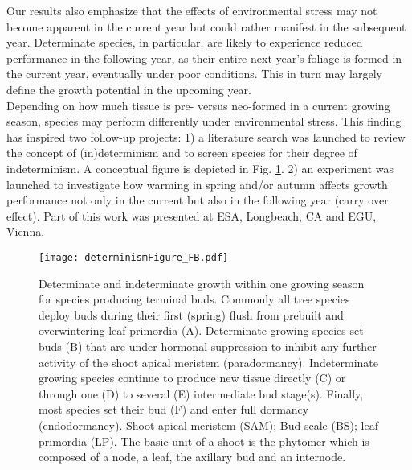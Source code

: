 \documentclass{article}
\begin{document}
			Our results also emphasize that the effects of environmental stress may not become apparent in the current year but could rather manifest in the subsequent year. Determinate species, in particular, are likely to experience reduced performance in the following year, as their entire next year's foliage is formed in the current year, eventually under poor conditions. This in turn may largely define the growth potential  in the upcoming year.\\
			
			Depending on how much tissue is pre- versus neo-formed in a current growing season, species may perform differently under environmental stress. This finding has inspired two follow-up projects: 1) a literature search was launched to review the concept of (in)determinism and to screen species for their degree of indeterminism. A conceptual figure is depicted in Fig. \ref{fig:determinismFigure_FB}. 2) an experiment was launched to investigate how warming in spring and/or autumn affects growth performance not only in the current but also in the following year (carry over effect). Part of this work was presented at ESA, Longbeach, CA and EGU, Vienna. 
			
	\begin{figure}[H]
	\centering
	\texttt{[image: determinismFigure\_FB.pdf]} 
	\caption{Determinate and indeterminate growth within one growing season for species producing terminal buds. Commonly all tree species deploy buds during their first (spring) flush from prebuilt and overwintering leaf primordia (A). Determinate growing species set buds (B) that are under hormonal suppression to inhibit any further activity of the shoot apical meristem (paradormancy). Indeterminate growing species continue to produce new tissue directly (C) or through one (D) to several (E) intermediate bud stage(s). Finally, most species set their bud (F) and enter full dormancy (endodormancy). Shoot apical meristem (SAM); Bud scale (BS); leaf primordia (LP). The basic unit of a shoot is the phytomer which is composed of a node, a leaf, the axillary bud and an internode.}
	\label{fig:determinismFigure_FB}
	\end{figure}
	
	


	
	

	
	
	

	
	
	
	
	\newpage
	
	
	
	
	
	
	
	
	
	
\end{document}
